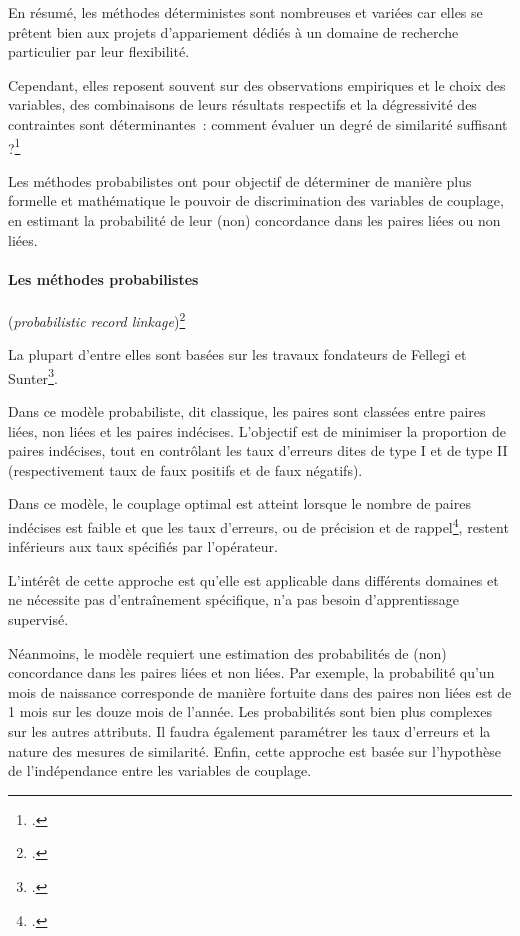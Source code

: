 \documentclass[a4paper,12pt,twoside]{book}
\begin{document}
    			    En résumé, les méthodes déterministes sont nombreuses et variées car elles se prêtent bien aux projets d'appariement dédiés à un domaine de recherche particulier par leur flexibilité.
    			    
    			    Cependant, elles reposent souvent sur des observations empiriques et le choix des variables, des combinaisons de leurs résultats respectifs et la dégressivité des contraintes sont déterminantes~: comment évaluer un degré de similarité suffisant ?\footcite[Voir sur ce point la discussion dans~:][]{wangEntityMatchingHow2011}
    			    
    			    Les méthodes probabilistes ont pour objectif de déterminer de manière plus formelle et mathématique le pouvoir de discrimination des variables de couplage, en estimant la probabilité de leur (non) concordance dans les paires liées ou non liées.
			    \pagebreak
                \paragraph{Les \textbf{méthodes probabilistes}} (\textit{probabilistic record linkage})\footcite[][pp.~133-139]{christenDataMatchingConcepts2012}
			    
			    La plupart d'entre elles sont basées sur les travaux fondateurs de Fellegi et Sunter\footcite{fellegiTheoryRecordLinkage1969}.
			    
			    Dans ce modèle probabiliste, dit \og{}classique\fg{}, les paires sont classées entre paires liées, non liées et les paires indécises.
			    L'objectif est de minimiser la proportion de paires indécises, tout en contrôlant les taux d'erreurs dites de \og{}type I\fg{} et de \og{}type II\fg{} (respectivement taux de faux positifs et de faux négatifs).
			    
			    Dans ce modèle, le couplage optimal est atteint lorsque le nombre de paires indécises est faible et que les taux d'erreurs, ou de précision et de rappel\footcite{PrecisionRappel2022}, restent inférieurs aux taux spécifiés par l'opérateur.

			    L'intérêt de cette approche est qu'elle est applicable dans différents domaines et ne nécessite pas d'entraînement spécifique, n'a pas besoin d'apprentissage supervisé.
			    
			    Néanmoins, le modèle requiert une estimation des probabilités de (non) concordance dans les paires liées et non liées. Par exemple, la probabilité qu'un mois de naissance corresponde de manière fortuite dans des paires non liées est de 1 mois sur les douze mois de l'année. Les probabilités sont bien plus complexes sur les autres attributs.
			    Il faudra également paramétrer les taux d'erreurs et la nature des mesures de similarité.
			    Enfin, cette approche est basée sur l'hypothèse de l'indépendance entre les variables de couplage.
			    
\end{document}
